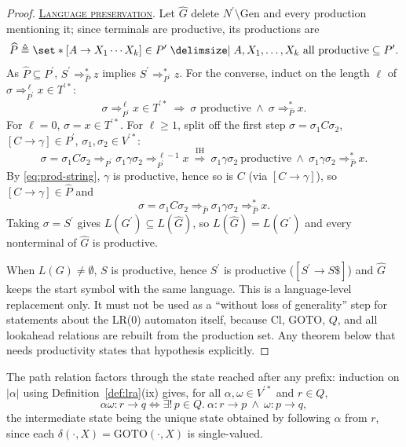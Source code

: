\documentclass[11pt,a4paper]{article}
\theoremstyle{prettyplain}
\theoremstyle{prettydef}
\def\mid{\;\delimsize\vert\;}#1%
\newcommand{\Path}[3]{#1:#2\to#3}
\newcommand{\Item}[2]{[#1\to #2]}
\newcommand{\proofpart}[1]{\par\medskip\noindent\uline{\textsc{#1}}.}
\begin{document}
\begin{proof}
\proofpart{Language preservation}
Let \(\widehat G\) delete \(N^\prime\setminus\mathrm{Gen}\) and every production
mentioning it; since terminals are productive, its productions are
\[
\widehat P
\triangleq
\set*{\Item{A}{X_1\cdots X_k}\in P^\prime\mid
A,X_1,\ldots,X_k\ \text{all productive}}
\subseteq P^\prime .
\]
As \(\widehat P\subseteq P^\prime\), \(S^\prime\Rightarrow_{\widehat P}^*z\) implies
\(S^\prime\Rightarrow_{P^\prime}^*z\).  For the converse, induct on the length
\(\ell\) of \(\sigma\Rightarrow_{P^\prime}^{\,\ell}x\in T^{\prime *}\):
\[
\sigma\Rightarrow_{P^\prime}^{\,\ell}x\in T^{\prime *}
\ \Longrightarrow\
\sigma\text{ productive}\ \land\ \sigma\Rightarrow_{\widehat P}^*x .
\]
For \(\ell=0\), \(\sigma=x\in T^{\prime *}\).  For \(\ell\ge1\), split off the
first step \(\sigma=\sigma_1C\sigma_2\), \(\Item{C}{\gamma}\in P^\prime\),
\(\sigma_1,\sigma_2\in V^{\prime *}\):
\[
\sigma=\sigma_1C\sigma_2
\Rightarrow_{P^\prime}
\sigma_1\gamma\sigma_2
\Rightarrow_{P^\prime}^{\,\ell-1}x
\ \overset{\mathrm{IH}}{\Longrightarrow}\
\sigma_1\gamma\sigma_2\ \text{productive}\ \land\
\sigma_1\gamma\sigma_2\Rightarrow_{\widehat P}^*x .
\]
By \eqref{eq:prod-string}, \(\gamma\) is productive, hence so is \(C\)
(via \(\Item{C}{\gamma}\)), so \(\Item{C}{\gamma}\in\widehat P\) and
\[
\sigma=\sigma_1C\sigma_2
\Rightarrow_{\widehat P}
\sigma_1\gamma\sigma_2
\Rightarrow_{\widehat P}^*x .
\]
Taking \(\sigma=S^\prime\) gives \(L(G^\prime)\subseteq L(\widehat G)\), so
\(L(\widehat G)=L(G^\prime)\) and every nonterminal of \(\widehat G\) is
productive.

When \(L(G)\ne\emptyset\), \(S\) is productive, hence \(S^\prime\) is productive
(\(\Item{S^\prime}{S\$}\)) and \(\widehat G\) keeps the start symbol with the same
language.  This is a language-level replacement only.  It must not be used as a
``without loss of generality'' step for statements about the LR(0) automaton
itself, because \(\mathrm{Cl}\), \(\mathrm{GOTO}\), \(Q\), and all lookahead
relations are rebuilt from the production set.  Any theorem below that needs
productivity states that hypothesis explicitly.
\end{proof}

The path relation factors through the state reached after any prefix: induction
on \(|\alpha|\) using Definition~\ref{def:lra}(ix) gives, for all
\(\alpha,\omega\in V^{\prime *}\) and \(r\in Q\),
\begin{equation}\label{eq:path-concat}
\Path{\alpha\omega}{r}{q}
\iff
\exists!\,p\in Q.\ \Path{\alpha}{r}{p}\ \land\ \Path{\omega}{p}{q},
\end{equation}
the intermediate state being the unique state obtained by following \(\alpha\)
from \(r\), since each \(\delta(\cdot,X)=\mathrm{GOTO}(\cdot,X)\) is
single-valued.
\end{document}
